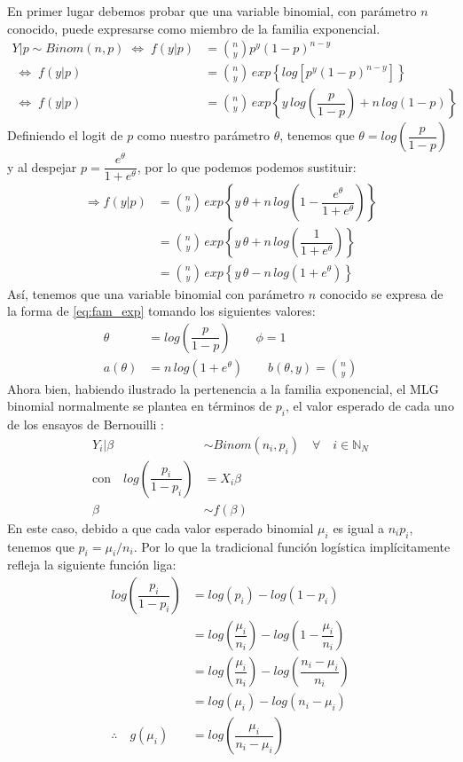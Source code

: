 En primer lugar debemos probar que una variable binomial, con parámetro $n$ conocido, puede expresarse como miembro de la familia exponencial. 
\begin{align*}
Y|p \sim Binom(n,p) \;\Leftrightarrow\; f(y|p) &= {n\choose y}p^y(1-p)^{n-y} \\
\;\Leftrightarrow\; f(y|p) &= {n\choose y}\,exp\left\lbrace log\left[p^y(1-p)^{n-y}\right]\right\rbrace \\
\;\Leftrightarrow\; f(y|p) &= {n\choose y}\,exp\left\lbrace y\,log\left(\dfrac{p}{1-p}\right)+n\,log\left(1-p\right)\right\rbrace
\end{align*}
Definiendo el logit de $p$ como nuestro parámetro $\theta$, tenemos que $\theta = log\left(\dfrac{p}{1-p}\right)$ y al despejar $p = \dfrac{e^\theta}{1+e^\theta}$, por lo que podemos podemos sustituir: \begin{align} \label{eq:Veros_Binomial}
\Rightarrow f(y|p) &= {n\choose y}\,exp\left\lbrace y\,\theta+n\,log\left(1-\dfrac{e^\theta}{1+e^\theta}\right)\right\rbrace \nonumber \\
&= {n\choose y}\,exp\left\lbrace y\,\theta+n\,log\left(\dfrac{1}{1+e^\theta}\right)\right\rbrace \nonumber \\
&= {n\choose y}\,exp\left\lbrace y\,\theta-n\,log\left(1+e^\theta\right)\right\rbrace
\end{align} 
Así, tenemos que una variable binomial con parámetro $n$ conocido se expresa de la forma de \eqref{eq:fam_exp} tomando los siguientes valores: 
\begin{align*}
\theta &= log\left(\dfrac{p}{1-p}\right) \qquad \phi = 1\\
a(\theta) &= n\,log\left(1+e^\theta\right) \qquad b(\theta,y) = {n\choose y}
\end{align*}
Ahora bien, habiendo ilustrado la pertenencia a la familia exponencial, el MLG binomial normalmente se plantea en términos de $p_i$, el valor esperado de cada uno de los ensayos de Bernouilli \parencite{Gelman13}:
\begin{align*}
Y_i|\beta & \sim Binom(n_i,p_i) \quad \forall \quad i \in \mathbb{N}_N \nonumber \\
\text{con} \quad log\left(\dfrac{p_i}{1-p_i}\right) &= X_i\beta \nonumber \\
\beta &\sim f(\beta)
\end{align*}
En este caso, debido a que cada valor esperado binomial $\mu_i$ es igual a $n_ip_i$, tenemos que $p_i=\mu_i/n_i$. Por lo que la tradicional función logística implícitamente refleja la siguiente función liga: 
\begin{align*}
log\left(\dfrac{p_i}{1-p_i}\right)&=log(p_i)-log(1-p_i)\\
&=log\left(\dfrac{\mu_i}{n_i}\right)-log\left(1-\dfrac{\mu_i}{n_i}\right)\\ 
&= log\left(\dfrac{\mu_i}{n_i}\right)-log\left(\dfrac{n_i-\mu_i}{n_i}\right)\\
&=log\left(\mu_i\right)-log\left(n_i-\mu_i\right)\\ 
\therefore \quad g(\mu_i)&=log\left(\dfrac{\mu_i}{n_i-\mu_i}\right)
\end{align*}

